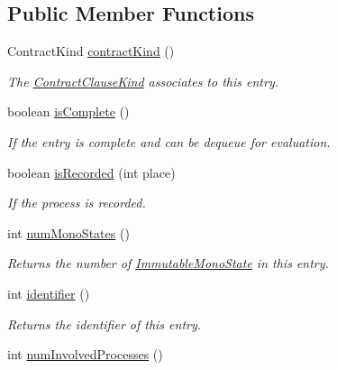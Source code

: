 \subsection*{Public Member Functions}
\begin{DoxyCompactItemize}
\item 
Contract\+Kind \hyperlink{interfaceedu_1_1udel_1_1cis_1_1vsl_1_1civl_1_1state_1_1IF_1_1CollectiveSnapshotsEntry_add21e111c0a6e5025967836b8a7d0b3e}{contract\+Kind} ()
\begin{DoxyCompactList}\small\item\em The \hyperlink{}{Contract\+Clause\+Kind} associates to this entry. \end{DoxyCompactList}\item 
boolean \hyperlink{interfaceedu_1_1udel_1_1cis_1_1vsl_1_1civl_1_1state_1_1IF_1_1CollectiveSnapshotsEntry_a75e191e9b1d918e414acdcd07099b88d}{is\+Complete} ()
\begin{DoxyCompactList}\small\item\em If the entry is complete and can be dequeue for evaluation. \end{DoxyCompactList}\item 
boolean \hyperlink{interfaceedu_1_1udel_1_1cis_1_1vsl_1_1civl_1_1state_1_1IF_1_1CollectiveSnapshotsEntry_a8e33c119feea077a9ab7d618d1293f79}{is\+Recorded} (int place)
\begin{DoxyCompactList}\small\item\em If the process is recorded. \end{DoxyCompactList}\item 
int \hyperlink{interfaceedu_1_1udel_1_1cis_1_1vsl_1_1civl_1_1state_1_1IF_1_1CollectiveSnapshotsEntry_a5e46ad6c98a1c3d0e1da612ba72f6ca6}{num\+Mono\+States} ()
\begin{DoxyCompactList}\small\item\em Returns the number of \hyperlink{}{Immutable\+Mono\+State} in this entry. \end{DoxyCompactList}\item 
int \hyperlink{interfaceedu_1_1udel_1_1cis_1_1vsl_1_1civl_1_1state_1_1IF_1_1CollectiveSnapshotsEntry_a5d9af6924cd4b16e13529bd8e76682b7}{identifier} ()
\begin{DoxyCompactList}\small\item\em Returns the identifier of this entry. \end{DoxyCompactList}\item 
int \hyperlink{interfaceedu_1_1udel_1_1cis_1_1vsl_1_1civl_1_1state_1_1IF_1_1CollectiveSnapshotsEntry_a1da01bf3a1dc4f76159ee3c1a7ee2fbe}{num\+Involved\+Processes} ()

\end{DoxyCompactItemize}
